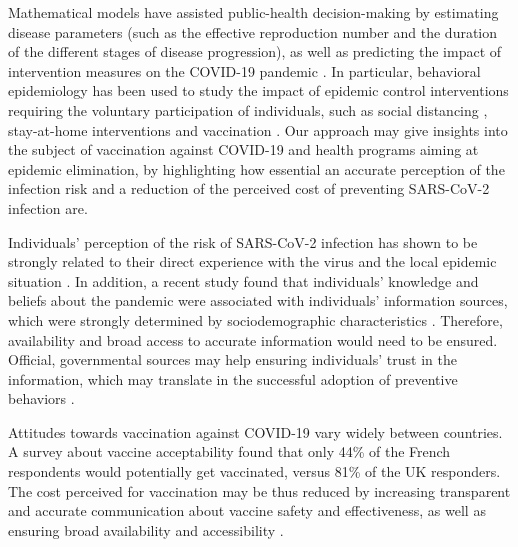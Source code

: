 Mathematical models have assisted public-health decision-making by estimating disease parameters (such as the effective reproduction number and the duration of the different stages of disease progression), as well as predicting the impact of intervention measures on the COVID-19 pandemic \cite[]{Xiang2021}. In particular, behavioral epidemiology has been used to study the impact of epidemic control interventions requiring the voluntary participation of individuals, such as social distancing \cite[]{Gupta2020}, stay-at-home interventions \cite[]{Kabir2020} and vaccination \cite[]{Choi2020,Jentsch2020}. Our approach may give insights into the subject of vaccination against COVID-19 and health programs aiming at epidemic elimination, by highlighting how essential an accurate perception of the infection risk and a reduction of the perceived cost of preventing SARS-CoV-2 infection are. 

Individuals' perception of the risk of SARS-CoV-2 infection has shown to be strongly related to their direct experience with the virus and the local epidemic situation \cite[]{Mansilla2020,Elharake2021}. In addition, a recent study found that individuals' knowledge and beliefs about the pandemic were associated with individuals' information sources, which were strongly determined by sociodemographic characteristics \cite[]{Ali2020}. Therefore, availability and broad access to accurate information would need to be ensured. Official, governmental sources may help ensuring individuals' trust in the information, which may translate in the successful adoption of preventive behaviors \cite[]{Lim2020}.

Attitudes towards vaccination against COVID-19 vary widely between countries. A survey about vaccine acceptability \cite{Wuoters2021} found that only 44\% of the French respondents would potentially get vaccinated, versus 81\% of the UK responders. The cost perceived for vaccination may be thus reduced by increasing transparent and accurate communication about vaccine safety and effectiveness, as well as ensuring broad availability and accessibility \cite[]{Wuoters2021}. 

%

